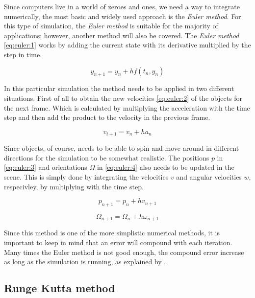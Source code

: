 \documentclass[a4paper,12pt]{report}
\begin{document}
Since computers live in a world of zeroes and ones, we need a way to integrate numerically, the most basic and widely used approach is the \emph{Euler method}\cite{gdm}. For this type of simulation, the \emph{Euler method} is suitable for the majority of applications; however, another method will also be covered. The \emph{Euler method} \ref{eq:euler:1} works by adding the current state with its derivative multiplied by the step in time.

\begin{equation}
y_{n+1}=y_{n}+hf(t_n, y_n)
\label{eq:euler:1}
\end{equation}

In this particular simulation the method needs to be applied in two different situations. First of all to obtain the new velocities \ref{eq:euler:2} of the objects for the next frame. Which is calculated by multiplying the acceleration with the time step and then add the product to the velocity in the previous frame.

\begin{equation}
v_{t+1}=v_n+ha_n
\label{eq:euler:2}
\end{equation}

Since objects, of course, needs to be able to spin and move around in different directions for the simulation to be somewhat realistic. The positions $p$ in \ref{eq:euler:3} and orientations $\Omega$ in \ref{eq:euler:4} also needs to be updated in the scene. This is simply done by integrating the velocities $v$ and angular velocities $w$, respecivley, by multiplying with the time step.

\begin{equation}
p_{n+1}=p_n+hv_{n+1}
\label{eq:euler:3}
\end{equation}

\begin{equation}
\Omega_{n+1}=\Omega_n+h\omega_{n+1}
\label{eq:euler:4}
\end{equation}

Since this method is one of the more simplistic numerical methods, it is important to keep in mind that an error will compound with each iteration. Many times the Euler method is not good enough, the compound error increase as long as the simulation is running, as explained by \cite{gog}.

\subsection{Runge Kutta method}
\end{document}
